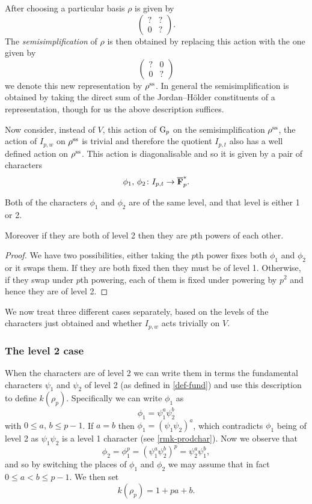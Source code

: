 \documentclass[a4paper,12pt]{article}
\begin{document}
After choosing a particular basis $\rho$ is given by
\[
\begin{pmatrix}
? & ? \\
0 & ?
\end{pmatrix}.
\]
The \emph{semisimplification} of $\rho$ is then obtained by replacing this action with the one given by
\[
\begin{pmatrix}
? & 0 \\
0 & ?
\end{pmatrix}
\]
we denote this new representation by $\rho^\text{ss}$. %
In general the semisimplification is obtained by taking the direct sum of the Jordan--H\"older constituents of a representation, though for us the above description suffices.

Now consider, instead of $V$, this action of $\mathrm{G}_p$ on the semisimplification $\rho^\text{ss}$, the action of $I_{p,w}$ on $\rho^\text{ss}$ is trivial and therefore the quotient $I_{p,t}$ also has a well defined action on $\rho^\text{ss}$.
This action is diagonalisable and so it is given by a pair of characters
\[
\phi_1,\,\phi_2\colon I_{p,t} \to \overline{\mathbf{F}}_p^*.
\]

\begin{prop}
Both of the characters $\phi_1$ and $\phi_2$ are of the same level, and that level is either 1 or 2.

Moreover if they are both of level 2 then they are $p$th powers of each other.
\end{prop}
\begin{proof}
We have two possibilities, either taking the $p$th power fixes both $\phi_1$ and $\phi_2$ or it swaps them.
If they are both fixed then they must be of level 1.
Otherwise, if they swap under $p$th powering, each of them is fixed under powering by $p^2$ and hence they are of level 2.
\end{proof}

We now treat three different cases separately, based on the levels of the characters just obtained and whether $I_{p,w}$ acts trivially on $V$.


\subsubsection{The level 2 case}\label{sec-l2}
When the characters are of level 2 we can write them in terms the fundamental characters $\psi_1$ and $\psi_2$ of level 2 (as defined in \cref{def-fund}) and use this description to define $k(\rho_p)$.
Specifically we can write $\phi_1$ as
\[
\phi_1 = \psi_1^a\psi_2^b
\]
with $0\le a,\,b\le p-1$.
If $a = b$ then $\phi_1 = (\psi_1 \psi_2)^a$, which contradicts $\phi_1$ being of level 2 as $\psi_1\psi_2$ is a level 1 character (see \cref{rmk-prodchar}).
Now we observe that
\[
\phi_2 = \phi_1^p = (\psi_1^a\psi_2^b)^p = \psi_2^a\psi_1^b,
\]
and so by switching the places of $\phi_1$ and $\phi_2$ we may assume that in fact $0\le a < b\le p-1$.
We then set
\begin{equation}\label{eqn-l2}
k(\rho_p) = 1 + pa + b.
\end{equation}
\end{document}
